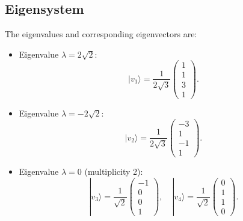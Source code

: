 \documentclass{article}
\begin{document}
\subsection*{Eigensystem}
The eigenvalues and corresponding eigenvectors are:
\begin{itemize}
    \item Eigenvalue \( \lambda = 2\sqrt{2} \):
    \[
    |v_1\rangle = \frac{1}{2\sqrt{3}} \begin{pmatrix} 1 \\ 1 \\ 3 \\ 1 \end{pmatrix}.
    \]
    \item Eigenvalue \( \lambda = -2\sqrt{2} \):
    \[
    |v_2\rangle = \frac{1}{2\sqrt{3}} \begin{pmatrix} -3 \\ 1 \\ -1 \\ 1 \end{pmatrix}.
    \]
    \item Eigenvalue \( \lambda = 0 \) (multiplicity 2):
    \[
    |v_3\rangle = \frac{1}{\sqrt{2}} \begin{pmatrix} -1 \\ 0 \\ 0 \\ 1 \end{pmatrix}, \quad |v_4\rangle = \frac{1}{\sqrt{2}} \begin{pmatrix} 0 \\ 1 \\ 1 \\ 0 \end{pmatrix}.
    \]
\end{itemize}
\end{document}
